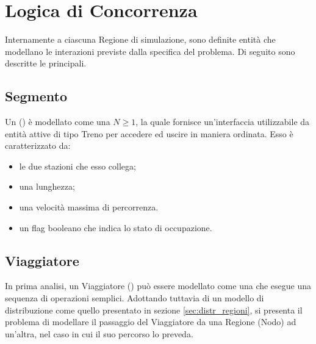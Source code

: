 \section{Logica di Concorrenza}

Internamente a ciascuna Regione di simulazione, sono definite entità che modellano le interazioni previste dalla specifica del problema. Di seguito sono descritte le principali.

	
	\subsection{Segmento}\label{subsec:segment_def}
	
	Un  () è modellato come una  $N\ge1$, la quale fornisce un'interfaccia utilizzabile da entità attive di tipo Treno per accedere ed uscire in maniera ordinata. Esso è caratterizzato da:
			\begin{itemize}
				\item le due stazioni che esso collega;
				\item una lunghezza;
				\item una velocità massima di percorrenza.
				\item un flag booleano  che indica lo stato di occupazione.
			\end{itemize}


	\subsection{Viaggiatore}\label{subsec:traveler_def}		
	
	In prima analisi, un Viaggiatore () può essere modellato come una  che esegue una sequenza di operazioni semplici. Adottando tuttavia di un modello di distribuzione come quello presentato in sezione \ref{sec:distr_regioni}, si presenta il problema di modellare il passaggio del Viaggiatore da una Regione (Nodo) ad un'altra, nel caso in cui il suo percorso lo preveda.
	
